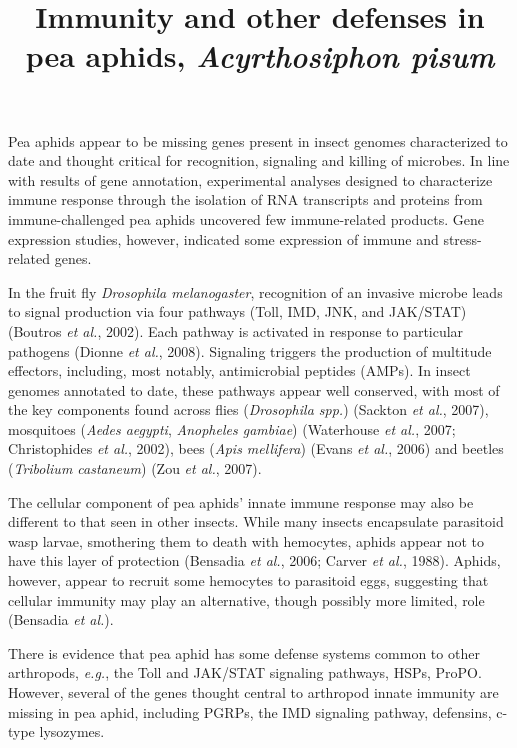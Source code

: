 \documentclass[11pt]{article}
\title{Immunity and other defenses in pea aphids, \textit{Acyrthosiphon pisum}}
\author{}
\date{}
\begin{document}
  \maketitle

  \linenumbers
Pea aphids appear to be missing genes present in insect genomes characterized to date and thought critical for recognition, signaling and killing of microbes. 
In line with results of gene annotation, experimental analyses designed to characterize immune response through the isolation of RNA transcripts and proteins from immune-challenged pea aphids uncovered few immune-related products. 
Gene expression studies, however, indicated some expression of immune and stress-related genes.

\newline

In the fruit fly \textit{Drosophila melanogaster}, recognition of an invasive microbe leads to signal production via four pathways (Toll, IMD, JNK, and JAK/STAT) (Boutros \textit{et al.}, 2002). 
Each pathway is activated in response to particular pathogens (Dionne \textit{et al.}, 2008). 
Signaling triggers the production of multitude effectors, including, most notably, antimicrobial peptides (AMPs). 
In insect genomes annotated to date, these pathways appear well conserved, with most of the key components found across flies (\textit{Drosophila spp.}) (Sackton \textit{et al.}, 2007), mosquitoes (\textit{Aedes aegypti}, \textit{Anopheles gambiae}) (Waterhouse \textit{et al.}, 2007; Christophides \textit{et al.}, 2002), bees (\textit{Apis mellifera}) (Evans \textit{et al.}, 2006) and beetles (\textit{Tribolium castaneum}) (Zou \textit{et al.}, 2007).

\newline

The cellular component of pea aphids’ innate immune response may also be different to that seen in other insects. 
While many insects encapsulate parasitoid wasp larvae, smothering them to death with hemocytes, aphids appear not to have this layer of protection (Bensadia \textit{et al.}, 2006; Carver \textit{et al.}, 1988). 
Aphids, however, appear to recruit some hemocytes to parasitoid eggs, suggesting that cellular immunity may play an alternative, though possibly more limited, role (Bensadia \textit{et al.}).

\newline

There is evidence that pea aphid has some defense systems common to other arthropods, \textit{e.g.}, the Toll and JAK/STAT signaling pathways, HSPs, ProPO. 
However, several of the genes thought central to arthropod innate immunity are missing in pea aphid, including PGRPs, the IMD signaling pathway, defensins, c-type lysozymes. 
\end{document}
